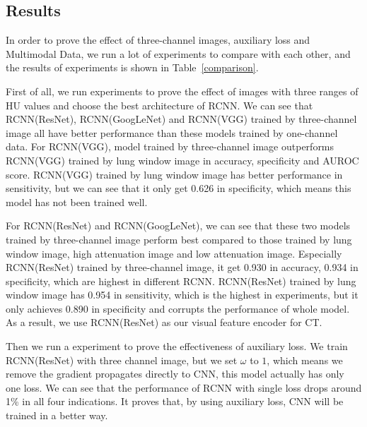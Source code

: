 \subsection{Results}
\label{results}
In order to prove the effect of three-channel images, auxiliary loss and Multimodal Data, we run a lot of experiments to compare with each other, and the results of experiments is shown in Table~\ref{comparison}.

First of all, we run experiments to prove the effect of images with three ranges of HU values and choose the best architecture of RCNN. We can see that RCNN(ResNet), RCNN(GoogLeNet) and RCNN(VGG) trained by three-channel image all have better performance than these models trained by one-channel data. 
For RCNN(VGG), model trained by three-channel image outperforms RCNN(VGG) trained by lung window image in accuracy, specificity and AUROC score. RCNN(VGG) trained by lung window image has better performance in sensitivity, but we can see that it only get 0.626 in specificity, which means this model has not been trained well. 

For RCNN(ResNet) and RCNN(GoogLeNet), we can see that these two models trained by three-channel image perform best compared to those trained by lung window image, high attenuation image and low attenuation image. Especially RCNN(ResNet) trained by three-channel image, it get 0.930 in accuracy, 0.934 in specificity, which are highest in different RCNN. RCNN(ResNet) trained by lung window image has 0.954 in sensitivity, which is the highest in experiments, but it only achieves 0.890 in specificity and corrupts the performance of whole model. As a result, we use RCNN(ResNet) as our visual feature encoder for CT.

Then we run a experiment to prove the effectiveness of auxiliary loss. We train RCNN(ResNet) with three channel image, but we set $\omega$ to $1$, which means we remove the gradient propagates directly to CNN, this model actually has only one loss. We can see that the performance of RCNN with single loss drops around 1\% in all four indications. It proves that, by using auxiliary loss, CNN will be trained in a better way. 

